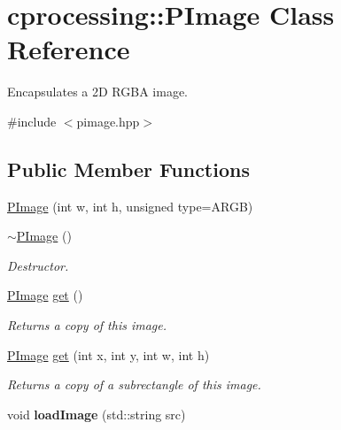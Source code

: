 \hypertarget{classcprocessing_1_1PImage}{\section{cprocessing\-:\-:\-P\-Image \-Class \-Reference}
\label{classcprocessing_1_1PImage}
}


\-Encapsulates a 2\-D \-R\-G\-B\-A image.  




{\ttfamily \#include $<$pimage.\-hpp$>$}

\subsection*{\-Public \-Member \-Functions}
\begin{DoxyCompactItemize}
\item 
\hyperlink{classcprocessing_1_1PImage_a1f6044cb12652ef38120e8a1cd087631}{\-P\-Image} (int w, int h, unsigned type=\-A\-R\-G\-B)
\item 
\hypertarget{classcprocessing_1_1PImage_ab816b49726026c86174a82ed5afb4ad0}{\hyperlink{classcprocessing_1_1PImage_ab816b49726026c86174a82ed5afb4ad0}{$\sim$\-P\-Image} ()}\label{classcprocessing_1_1PImage_ab816b49726026c86174a82ed5afb4ad0}

\begin{DoxyCompactList}\small\item\em \-Destructor. \end{DoxyCompactList}\item 
\hypertarget{classcprocessing_1_1PImage_a2b317924f150f4afbc0b07273746abf9}{\hyperlink{classcprocessing_1_1PImage}{\-P\-Image} \hyperlink{classcprocessing_1_1PImage_a2b317924f150f4afbc0b07273746abf9}{get} ()}\label{classcprocessing_1_1PImage_a2b317924f150f4afbc0b07273746abf9}

\begin{DoxyCompactList}\small\item\em \-Returns a copy of this image. \end{DoxyCompactList}\item 
\hypertarget{classcprocessing_1_1PImage_a38c5bc861ab4999e9b71367e45ab2fc0}{\hyperlink{classcprocessing_1_1PImage}{\-P\-Image} \hyperlink{classcprocessing_1_1PImage_a38c5bc861ab4999e9b71367e45ab2fc0}{get} (int x, int y, int w, int h)}\label{classcprocessing_1_1PImage_a38c5bc861ab4999e9b71367e45ab2fc0}

\begin{DoxyCompactList}\small\item\em \-Returns a copy of a subrectangle of this image. \end{DoxyCompactList}\item 
\hypertarget{classcprocessing_1_1PImage_af890772e2644313f266f32ee322e52c2}{void {\bfseries load\-Image} (std\-::string src)}\label{classcprocessing_1_1PImage_af890772e2644313f266f32ee322e52c2}


\end{DoxyCompactItemize}
